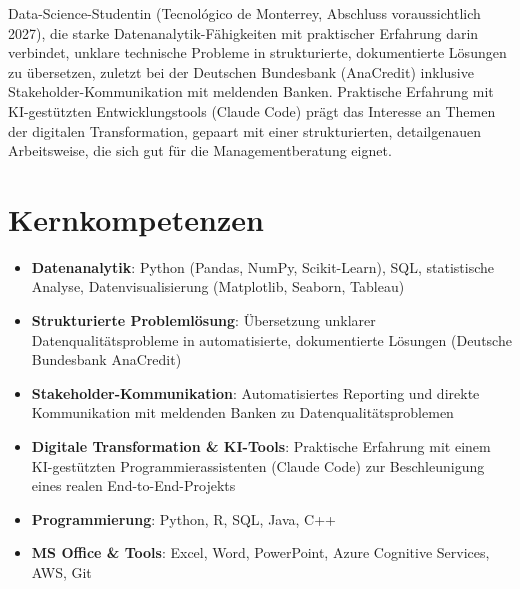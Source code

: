 \documentclass[11pt,a4paper,sans]{moderncv}
\begin{document}
\makecvtitle


\vspace{6pt}
\small{Data-Science-Studentin (Tecnológico de Monterrey, Abschluss voraussichtlich 2027), die starke Datenanalytik-Fähigkeiten mit praktischer Erfahrung darin verbindet, unklare technische Probleme in strukturierte, dokumentierte Lösungen zu übersetzen, zuletzt bei der Deutschen Bundesbank (AnaCredit) inklusive Stakeholder-Kommunikation mit meldenden Banken. Praktische Erfahrung mit KI-gestützten Entwicklungstools (Claude Code) prägt das Interesse an Themen der digitalen Transformation, gepaart mit einer strukturierten, detailgenauen Arbeitsweise, die sich gut für die Managementberatung eignet.}


\section{Kernkompetenzen}
\vspace{1pt}
\begin{itemize}

\item \textbf{Datenanalytik}: Python (Pandas, NumPy, Scikit-Learn), SQL, statistische Analyse, Datenvisualisierung (Matplotlib, Seaborn, Tableau)

\item \textbf{Strukturierte Problemlösung}: Übersetzung unklarer Datenqualitätsprobleme in automatisierte, dokumentierte Lösungen (Deutsche Bundesbank AnaCredit)

\item \textbf{Stakeholder-Kommunikation}: Automatisiertes Reporting und direkte Kommunikation mit meldenden Banken zu Datenqualitätsproblemen

\item \textbf{Digitale Transformation \& KI-Tools}: Praktische Erfahrung mit einem KI-gestützten Programmierassistenten (Claude Code) zur Beschleunigung eines realen End-to-End-Projekts

\item \textbf{Programmierung}: Python, R, SQL, Java, C++

\item \textbf{MS Office \& Tools}: Excel, Word, PowerPoint, Azure Cognitive Services, AWS, Git

\end{itemize}
\end{document}
